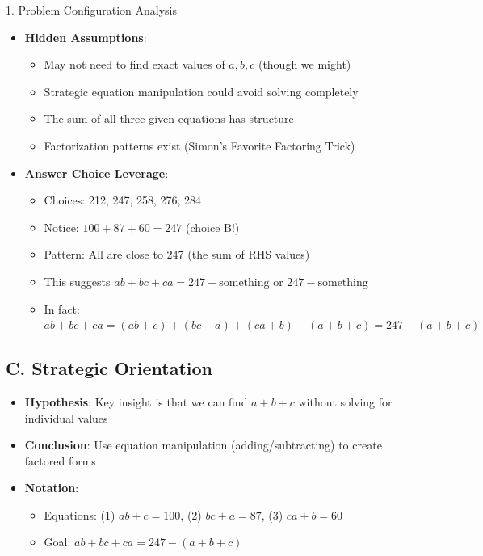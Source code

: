 \documentclass[12pt]{article}
\begin{document}
\begin{configbox}{1. Problem Configuration Analysis}
\begin{itemize}[leftmargin=*]
    \item \textbf{Hidden Assumptions}: 
    \begin{itemize}
        \item May not need to find exact values of $a, b, c$ (though we might)
        \item Strategic equation manipulation could avoid solving completely
        \item The sum of all three given equations has structure
        \item Factorization patterns exist (Simon's Favorite Factoring Trick)
    \end{itemize}
    
    \item \textbf{Answer Choice Leverage}: 
    \begin{itemize}
        \item Choices: 212, 247, 258, 276, 284
        \item Notice: $100 + 87 + 60 = 247$ (choice B!)
        \item Pattern: All are close to 247 (the sum of RHS values)
        \item This suggests $ab + bc + ca = 247 + \text{something}$ or $247 - \text{something}$
        \item In fact: $ab + bc + ca = (ab+c) + (bc+a) + (ca+b) - (a+b+c) = 247 - (a+b+c)$
    \end{itemize}
\end{itemize}

\subsection*{C. Strategic Orientation}
\begin{itemize}[leftmargin=*]
    \item \textbf{Hypothesis}: Key insight is that we can find $a+b+c$ without solving for individual values
    
    \item \textbf{Conclusion}: Use equation manipulation (adding/subtracting) to create factored forms
    
    \item \textbf{Notation}: 
    \begin{itemize}
        \item Equations: (1) $ab + c = 100$, (2) $bc + a = 87$, (3) $ca + b = 60$
        \item Goal: $ab + bc + ca = 247 - (a+b+c)$
    \end{itemize}
    

\end{itemize}
\end{configbox}
\end{document}
